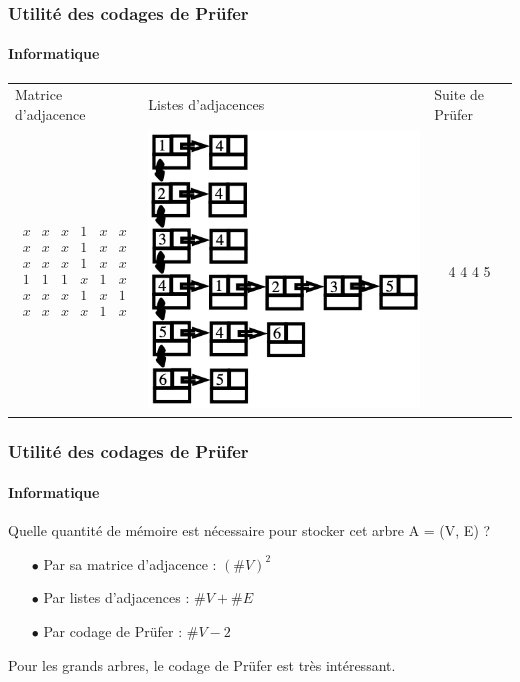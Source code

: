 \documentclass[11pt]{beamer}
\begin{document}
\begin{frame}
\frametitle{Utilité des codages de Prüfer}
\framesubtitle{Informatique}

\begin{table}[]
\centering
\begin{tabular}{l|l|l}
Matrice d'adjacence   & Listes d'adjacences   & Suite de Prüfer      \\
\multicolumn{1}{c|}{$\begin{array}{cccccc}
x & x & x & 1 & x & x \\ 
x & x & x & 1 & x & x \\ 
x & x & x & 1 & x & x \\ 
1 & 1 & 1 & x & 1 & x \\ 
x & x & x & 1 & x & 1 \\ 
x & x & x & x & 1 & x
\end{array}$ } & \multicolumn{1}{c|}{\includegraphics[scale=0.30]{listesAdj.png}} & \multicolumn{1}{c}{4 4 4 5}
\end{tabular}
\end{table}
\end{frame}

\begin{frame}
\frametitle{Utilité des codages de Prüfer}
\framesubtitle{Informatique}

Quelle quantité de mémoire est nécessaire pour stocker cet arbre A = (V, E) ?
\vspace{0.3cm}
\begin{enumerate}
\item[$\bullet$]Par sa matrice d'adjacence : $(\# V)^2$
\item[$\bullet$]Par listes d'adjacences : $\# V + \# E$
\item[$\bullet$]Par codage de Prüfer : $\# V - 2$
\end{enumerate}
\vspace{1cm}
Pour les grands arbres, le codage de Prüfer est très intéressant.
\end{frame}
\end{document}

